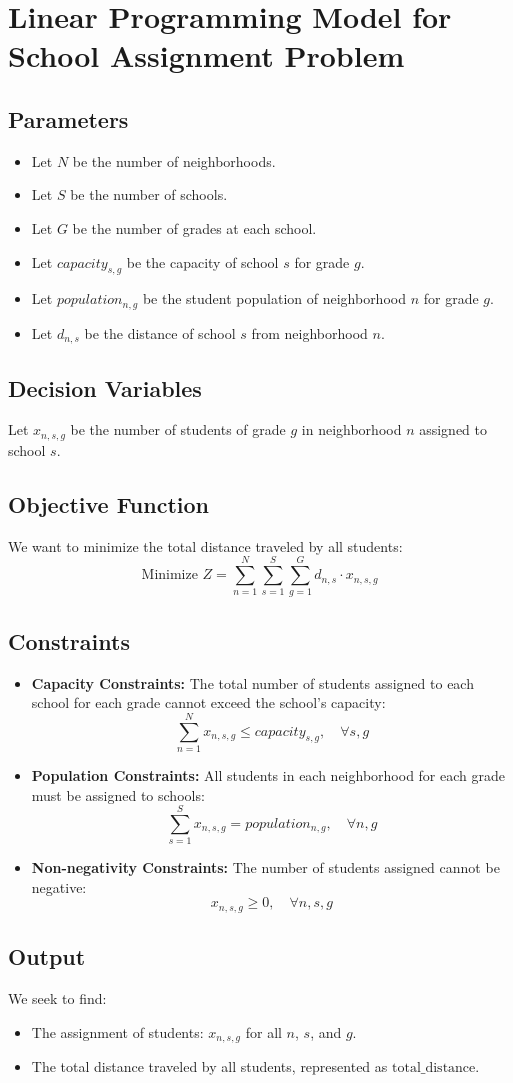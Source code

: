 \documentclass{article}
\begin{document}
\section*{Linear Programming Model for School Assignment Problem}

\subsection*{Parameters}
\begin{itemize}
    \item Let $N$ be the number of neighborhoods.
    \item Let $S$ be the number of schools.
    \item Let $G$ be the number of grades at each school.
    \item Let $capacity_{s,g}$ be the capacity of school $s$ for grade $g$.
    \item Let $population_{n,g}$ be the student population of neighborhood $n$ for grade $g$.
    \item Let $d_{n,s}$ be the distance of school $s$ from neighborhood $n$.
\end{itemize}

\subsection*{Decision Variables}
Let $x_{n,s,g}$ be the number of students of grade $g$ in neighborhood $n$ assigned to school $s$.

\subsection*{Objective Function}
We want to minimize the total distance traveled by all students:
\[
\text{Minimize } Z = \sum_{n=1}^{N} \sum_{s=1}^{S} \sum_{g=1}^{G} d_{n,s} \cdot x_{n,s,g}
\]

\subsection*{Constraints}
\begin{itemize}
    \item \textbf{Capacity Constraints:} The total number of students assigned to each school for each grade cannot exceed the school's capacity:
    \[
    \sum_{n=1}^{N} x_{n,s,g} \leq capacity_{s,g}, \quad \forall s, g
    \]
    
    \item \textbf{Population Constraints:} All students in each neighborhood for each grade must be assigned to schools:
    \[
    \sum_{s=1}^{S} x_{n,s,g} = population_{n,g}, \quad \forall n, g
    \]

    \item \textbf{Non-negativity Constraints:} The number of students assigned cannot be negative:
    \[
    x_{n,s,g} \geq 0, \quad \forall n, s, g
    \]
\end{itemize}

\subsection*{Output}
We seek to find:
\begin{itemize}
    \item The assignment of students: $x_{n,s,g}$ for all $n$, $s$, and $g$.
    \item The total distance traveled by all students, represented as $\text{total\_distance}$.
\end{itemize}
\end{document}
